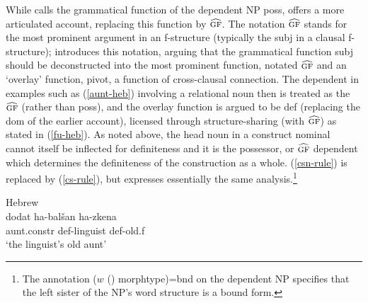 \documentclass[output=paper,hidelinks]{langscibook}
\begin{document}
\largerpage[-1.5]
While \citet{Falk01actnom} calls the grammatical function of the dependent NP {\sc poss}, \citet{Falk07} offers a more articulated account, replacing this function by $\widehat{\textsc{gf}}$.  The notation
$\widehat{\textsc{gf}}$ stands for the most prominent argument in an f-structure (typically the {\sc subj} in a clausal f-structure);  \citet{falk06} introduces this notation, arguing that the grammatical function {\sc subj} should be deconstructed into the most prominent function, notated $\widehat{\textsc{gf}}$ and an `overlay' function,  {\sc pivot}, a function of cross-clausal connection.   The dependent in examples such as  (\ref{aunt-heb}) involving a relational noun then is treated as the $\widehat{\textsc{gf}}$ (rather than {\sc poss}), and the overlay function is argued to be {\sc def} (replacing the {\sc dom} of the earlier account), licensed through structure-sharing (with $\widehat{\textsc{gf}}$) as stated in (\ref{fu-heb}).  As noted above, the head noun in a construct nominal cannot itself be inflected for definiteness and it is the possessor, or $\widehat{\textsc{gf}}$ dependent  which determines the definiteness of the construction as a whole.   (\ref{csn-rule}) is replaced by (\ref{cs-rule}), but expresses essentially the same analysis.\footnote{The annotation ($w$ ({\LSTAR}) {\sc morphtype})={\sc bnd}  on the dependent NP specifies
 that the left sister of the NP's word structure is a bound form.}






\largerpage
\ea
\label{aunt-heb}   Hebrew \citep[104]{Falk07} \\
\gll dodat ha-balšan ha-zkena\\
aunt.{\sc constr} {\sc def}-linguist {\sc def}-old.{\sc f}\\
\glt `the  linguist's old aunt'
\z

\ea
\label{cs-rule}  \hfill{\citet[113]{Falk07}}
\z



\end{document}
